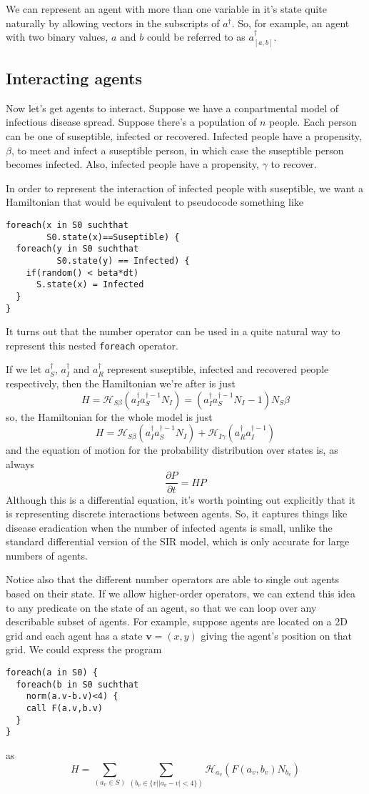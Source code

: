 \documentclass[letterpaper,twocolumn,10pt]{article}
\begin{document}
We can represent an agent with more than one variable in it's state quite naturally by allowing vectors in the subscripts of $a^\dag$. So, for example, an agent with two binary values, $a$ and $b$ could be referred to as $a^\dag_{[a,b]}$.

\subsection{Interacting agents}

Now let's get agents to interact. Suppose we have a conpartmental model of infectious disease spread. Suppose there's a population of $n$ people. Each person can be one of suseptible, infected or recovered. Infected people have a propensity, $\beta$, to meet and infect a suseptible person, in which case the suseptible person becomes infected. Also, infected people have a propensity, $\gamma$ to recover.

In order to represent the interaction of infected people with suseptible, we want a Hamiltonian that would be equivalent to pseudocode something like
\begin{verbatim}
foreach(x in S0 suchthat 
        S0.state(x)==Suseptible) {
  foreach(y in S0 suchthat
          S0.state(y) == Infected) {
    if(random() < beta*dt)
      S.state(x) = Infected
  }
}
\end{verbatim}

It turns out that the number operator can be used in a quite natural way to represent this nested \texttt{foreach} operator.

If we let $a^\dag_S$, $a^\dag_I$ and $a^\dag_R$ represent suseptible, infected and recovered people respectively, then the Hamiltonian we're after is just
\[
H = \mathcal{H}_{S\beta}(a^\dag_Ia^{\dag-1}_SN_I) = (a^\dag_Ia^{\dag-1}_SN_I - 1)N_S\beta
\]
so, the Hamiltonian for the whole model is just
\[
H = \mathcal{H}_{S\beta}(a^\dag_Ia^{\dag-1}_SN_I) + \mathcal{H}_{I\gamma}(a^\dag_Ra^{\dag-1}_I)
\]
and the equation of motion for the probability distribution over states is, as always
\[
\frac{\partial P}{\partial t} = HP
\]
Although this is a differential equation, it's worth pointing out explicitly that it is representing discrete interactions between agents. So, it captures things like disease eradication when the number of infected agents is small, unlike the standard differential version of the SIR model, which is only accurate for large numbers of agents.

Notice also that the different number operators are able to single out agents based on their state. If we allow higher-order operators, we can extend this idea to any predicate on the state of an agent, so that we can loop over any describable subset of agents. For example, suppose agents are located on a 2D grid and each agent has a state $\mathbf{v} = (x,y)$ giving the agent's position on that grid. We could express the program
\begin{verbatim}
foreach(a in S0) {
  foreach(b in S0 suchthat 
    norm(a.v-b.v)<4) {
    call F(a.v,b.v)
  }
}
\end{verbatim}
as
\[
H = \sum_{(a_v\in S)}\sum_{(b_v\in \{v | |a_v-v| < 4\})} \mathcal{H}_{a_v}(F(a_v,b_v)N_{b_v})
\]
\end{document}
